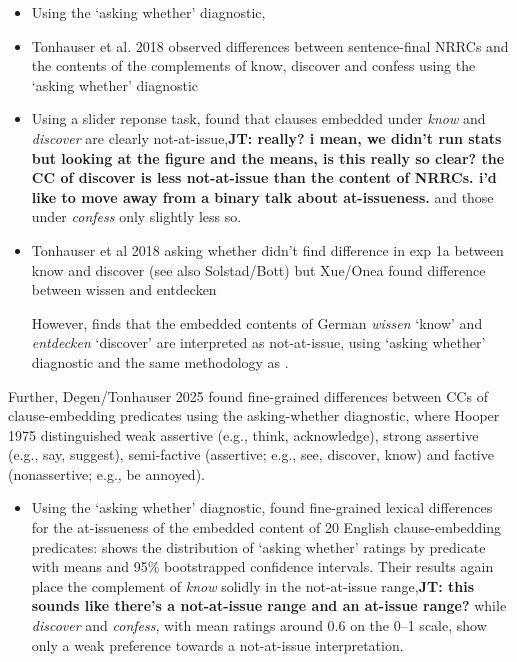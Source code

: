 \documentclass[times,linguex,xcolor]{glossa}
\newcommand{\jt}[1]{\textbf{\color{orange}JT: #1}}
\begin{document}
  \begin{itemize}
    \item Using the `asking whether' diagnostic, 
    \item  Tonhauser et al. 2018 observed differences between sentence-final NRRCs and the contents of the complements of know, discover and confess using the ‘asking whether’ diagnostic

    \item Using a slider reponse task, \citealt{tonhauser_how_2018} found that clauses embedded under \emph{know} and \emph{discover} are clearly not-at-issue,\jt{really? i mean, we didn't run stats but looking at the figure and the means, is this really so clear? the CC of discover is less not-at-issue than the content of NRRCs. i'd like to move away from a binary talk about at-issueness.} and those under \emph{confess} only slightly less so.

    \item Tonhauser et al 2018 asking whether didn't find difference in exp 1a between know and discover (see also Solstad/Bott) but Xue/Onea found difference between wissen and entdecken

    However, \citealt{solstad_cataphoric_2024} finds that the embedded contents of German \emph{wissen} `know' and \emph{entdecken} `discover' are interpreted as not-at-issue, using `asking whether' diagnostic and the same methodology as \citealt{tonhauser_how_2018,degen-tonhauser-glossa}.

  \end{itemize}

  Further, Degen/Tonhauser 2025 found fine-grained differences between CCs of clause-embedding predicates using the asking-whether diagnostic, where Hooper 1975 distinguished weak assertive (e.g., think, acknowledge), strong assertive (e.g., say, suggest), semi-factive (assertive; e.g., see, discover, know) and factive (nonassertive; e.g., be annoyed).

  \begin{itemize}
    \item Using the `asking whether' diagnostic, \citealt{degen-tonhauser-glossa} found fine-grained lexical differences for the at-issueness of the embedded content of 20 English clause-embedding predicates:  shows the distribution of `asking whether' ratings by predicate with means and 95\% bootstrapped confidence intervals. Their results again place the complement of \emph{know} solidly in the not-at-issue range,\jt{this sounds like there's a not-at-issue range and an at-issue range?} while \emph{discover} and \emph{confess}, with mean ratings around $0.6$ on the 0--1 scale, show only a weak preference towards a not-at-issue interpretation.

  \end{itemize}
\end{document}
